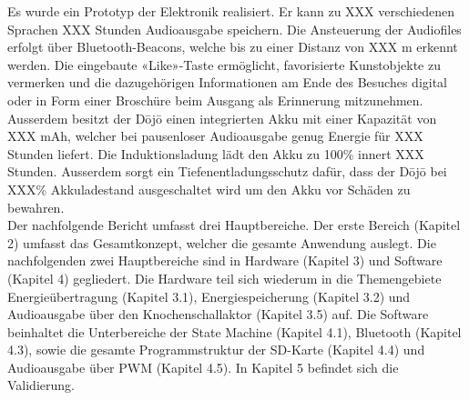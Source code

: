 Es wurde ein Prototyp der Elektronik realisiert. Er kann zu XXX verschiedenen Sprachen XXX Stunden Audioausgabe speichern. Die Ansteuerung der Audiofiles erfolgt über Bluetooth-Beacons, welche bis zu einer Distanz von XXX m erkennt werden. Die eingebaute «Like»-Taste ermöglicht, favorisierte Kunstobjekte zu vermerken und die dazugehörigen Informationen am Ende des Besuches digital oder in Form einer Broschüre beim Ausgang als Erinnerung mitzunehmen. Ausserdem besitzt der Dōjō einen integrierten Akku mit einer Kapazität von XXX mAh, welcher bei pausenloser Audioausgabe genug Energie für XXX Stunden liefert. Die Induktionsladung lädt den Akku zu 100\% innert XXX Stunden. Ausserdem sorgt ein Tiefenentladungsschutz dafür, dass der Dōjō bei XXX\% Akkuladestand ausgeschaltet wird um den Akku vor Schäden zu bewahren.\\
Der nachfolgende Bericht umfasst drei Hauptbereiche. Der erste Bereich (Kapitel 2) umfasst das Gesamtkonzept, welcher die gesamte Anwendung auslegt. Die nachfolgenden zwei Hauptbereiche sind in Hardware (Kapitel 3) und Software (Kapitel 4) gegliedert. Die Hardware teil sich wiederum in die Themengebiete Energieübertragung (Kapitel 3.1), Energiespeicherung (Kapitel 3.2) und Audioausgabe über den Knochenschallaktor (Kapitel 3.5) auf. Die Software beinhaltet die Unterbereiche der State Machine (Kapitel 4.1), Bluetooth (Kapitel 4.3), sowie die gesamte Programmstruktur der SD-Karte (Kapitel 4.4) und Audioausgabe über PWM (Kapitel 4.5). In Kapitel 5 befindet sich die Validierung.\\
